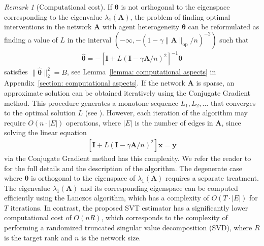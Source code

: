 \documentclass[11pt]{article}
\newcommand{\<}{\langle}
\renewcommand{\>}{\rangle}
\theoremstyle{plain}
\theoremstyle{definition}
\theoremstyle{remark}
\newtheorem{remark}{Remark}
\begin{document}
\begin{remark} [Computational cost]
 If \( \boldsymbol{\theta} \) is not orthogonal to the eigenspace corresponding to the eigenvalue \( \lambda_1(\mathbf{A}) \), the problem of finding optimal interventions in the network \( \mathbf{A} \) with agent heterogeneity \( \boldsymbol{\theta} \) can be reformulated as finding a value of \( L \) in the interval \( (-\infty, - (1 - \gamma \|\mathbf{A}\|_{\operatorname{op}} / n)^{-2}) \) such that  
 \begin{align}
\label{eq: hat theta equation}
 \widehat{\boldsymbol{\theta}} = - \left[ \mathbf{I} + L (\mathbf{I} - \gamma \mathbf{A} / n)^2 \right]^{-1} \boldsymbol{\theta}
 \end{align}  
 satisfies \( \| \widehat{\boldsymbol{\theta}} \|_2^2 = B \), see Lemma~\ref{lemma: computational aspects}  in Appendix~\ref{section: computational aspects}. 
 If the network \( \mathbf{A} \) is sparse, an approximate solution can be obtained iteratively using the Conjugate Gradient method. This procedure generates a monotone sequence \( L_1, L_2, \dots \) that converges to the optimal solution \( L \) (see \citep{gander1989constrained, reinsch1967smoothing}). However, each iteration of the algorithm may require \( O(n \cdot |E|) \) operations, where \( |E| \) is the number of edges in \( \mathbf{A} \), since solving the linear equation  
 \begin{align*}
\left[ \mathbf{I} + L (\mathbf{I} - \gamma \mathbf{A} / n)^2 \right] \mathbf{x} = \mathbf{y}
\end{align*}  
 via the Conjugate Gradient method has this complexity. We refer the reader to \cite{gander1989constrained} for the full details and the description of the algorithm.  
 The degenerate case where \( \boldsymbol{\theta} \) is orthogonal to the eigenspace of \( \lambda_1(\mathbf{A}) \) requires a separate treatment. The eigenvalue \( \lambda_1(\mathbf{A}) \) and its corresponding eigenspace can be computed efficiently using the Lanczos algorithm, which has a complexity of \( O(T \cdot |E|) \) for \( T \) iterations.  
 In contrast, the proposed SVT estimator has a significantly lower computational cost of \( O(nR) \), which corresponds to the complexity of performing a randomized truncated singular value decomposition (SVD), where \( R \) is the target rank and \( n \) is the network size.  
 \end{remark}
\end{document}
